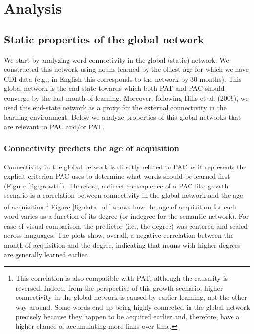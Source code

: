 \documentclass[10pt, letterpaper]{article}
\begin{document}
\section{Analysis}\label{analysis}

\subsection{Static properties of the global
network}\label{static-properties-of-the-global-network}

We start by analyzing word connectivity in the global (static) network.
We constructed this network using nouns learned by the oldest age for
which we have CDI data (e.g., in English this corresponds to the network
by 30 months). This global network is the end-state towards which both
PAT and PAC should converge by the last month of learning. Moreover,
following Hills et al. (2009), we used this end-state network as a proxy
for the external connectivity in the learning environment. Below we
analyze properties of this global networks that are relevant to PAC
and/or PAT.

\subsubsection{Connectivity predicts the age of
acquisition}\label{connectivity-predicts-the-age-of-acquisition}

Connectivity in the global network is directly related to PAC as it
represents the explicit criterion PAC uses to determine what words
should be learned first (Figure \ref{fig:growth}). Therefore, a direct
consequence of a PAC-like growth scenario is a correlation between
connectivity in the global network and the age of
acquisition.\footnote{This correlation is also compatible with PAT, although the causality is reversed. Indeed, from the perspective of this growth scenario, higher connectivity in the global network is caused by earlier learning, not the other way around. Some words end up being highly connected in the global network precisely because they happen to be acquired earlier and, therefore, have a higher chance of accumulating more links over time.}
Figure \ref{fig:data_all} shows how the age of acquisition for each word
varies as a function of its degree (or indegree for the semantic
network). For ease of visual comparison, the predictor (i.e., the
degree) was centered and scaled across languages. The plots show,
overall, a negative correlation between the month of acquisition and the
degree, indicating that nouns with higher degrees are generally learned
earlier.
\end{document}
